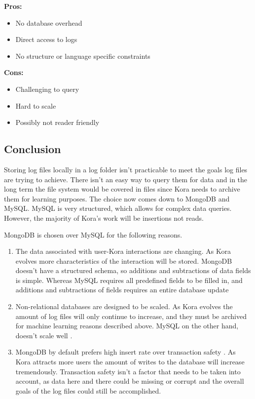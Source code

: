 \documentclass[onecolumn, draftclsnofoot,10pt, compsoc]{IEEEtran}
\begin{document}
			\textbf{Pros:}
				\begin{itemize}
					\item{
						No database overhead}
					\item{
						Direct access to logs}
					\item{
						No structure or language specific constraints}
				\end{itemize}
			\textbf{Cons:}
				\begin{itemize}
					\item{
						Challenging to query}
					\item{
						Hard to scale}
					\item{
						Possibly not reader friendly}
				\end{itemize}
		\subsection{Conclusion}
			Storing log files locally in a log folder isn't practicable to meet the goals log files are trying to achieve.
			There isn't an easy way to query them for data and in the long term the file system would be covered in files since Kora needs to archive them for learning purposes.
			The choice now comes down to MongoDB and MySQL.
			MySQL is very structured, which allows for complex data queries. 
			However, the majority of Kora's work will be insertions not reads.
			
			MongoDB is chosen over MySQL for the following reasons.
			\begin{enumerate}
				\item{
					The data associated with user-Kora interactions are changing.
					As Kora evolves more characteristics of the interaction will be stored.
					MongoDB doesn't have a structured schema, so additions and subtractions of data fields is simple.
					Whereas MySQL requires all predefined fields to be filled in, and additions and subtractions of fields requires an entire database update}
				\item{
					Non-relational databases are designed to be scaled.
					As Kora evolves the amount of log files will only continue to increase, and they must be archived for machine learning reasons described above. 
					MySQL on the other hand, doesn't scale well \cite{SQLvsNoSQLsitepoint}.}
				\item{
					MongoDB by default prefers high insert rate over transaction safety \cite{SQLvsNoSQLupwork}.
					As Kora attracts more users the amount of writes to the database will increase tremendously.
					Transaction safety isn't a factor that needs to be taken into account, as data here and there could be missing or corrupt and the overall goals of the log files could still be accomplished.}
			\end{enumerate}
			
\end{document}
